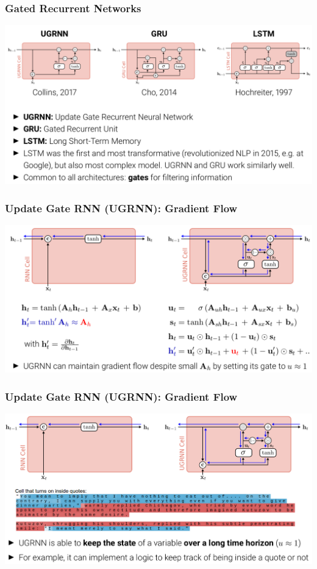 \documentclass[10pt]{beamer}
\begin{document}
\begin{frame}
  \frametitle{Gated Recurrent Networks}
\begin{center}
\includegraphics[width=\textwidth]{images/s17}
\end{center}
\end{frame}

\begin{frame}
  \frametitle{Update Gate RNN (UGRNN): Gradient Flow}
\begin{center}
\includegraphics[width=\textwidth]{images/s18}
\end{center}
\end{frame}

\begin{frame}
  \frametitle{Update Gate RNN (UGRNN): Gradient Flow}
\begin{center}
\includegraphics[width=\textwidth]{images/s19}
\end{center}
\end{frame}
\end{document}
